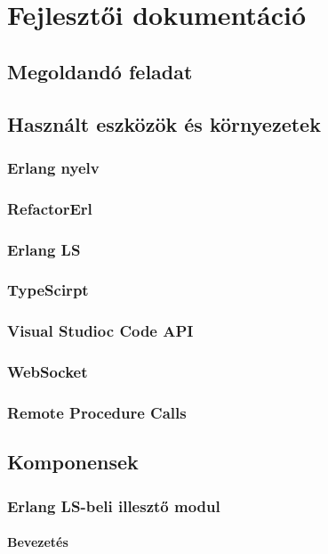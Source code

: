 

\chapter{Fejlesztői dokumentáció}
\label{ch:impl}


\section{Megoldandó feladat}
\section{Használt eszközök és környezetek}
\subsection{Erlang nyelv}
\subsection{RefactorErl}
\subsection{Erlang LS}
\subsection{TypeScirpt}
\subsection{Visual Studioc Code API}
\subsection{WebSocket}
\subsection{Remote Procedure Calls}

\section{Komponensek}
\subsection{Erlang LS-beli illesztő modul}
\subsubsection{Bevezetés}

